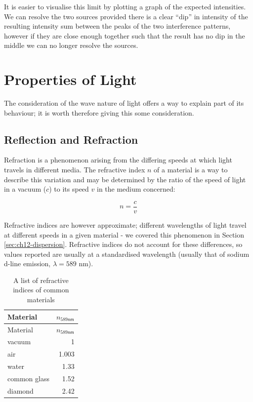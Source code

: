 \documentclass[
]{book}
\begin{document}
It is easier to visualise this limit by plotting a graph of the expected intensities. We can resolve the two sources provided there is a clear ``dip'' in intensity of the resulting intensity sum between the peaks of the two interference patterns, however if they are close enough together such that the result has no dip in the middle we can no longer resolve the sources.

\hypertarget{sec:ch14-propertieslight}{%
\chapter{Properties of Light}\label{sec:ch14-propertieslight}}

The consideration of the wave nature of light offers a way to explain part of its behaviour; it is worth therefore giving this some consideration.

\hypertarget{sec:ch14-reflectionrefraction}{%
\section{Reflection and Refraction}\label{sec:ch14-reflectionrefraction}}

Refraction is a phenomenon arising from the differing speeds at which light travels in different media. The refractive index \(n\) of a material is a way to describe this variation and may be determined by the ratio of the speed of light in a vacuum (\(c\)) to its speed \(v\) in the medium concerned:

\begin{equation}
n = \frac{c}{v}
\end{equation}

Refractive indices are however approximate; different wavelengths of light travel at different speeds in a given material - we covered this phenomenon in Section \ref{sec:ch12-dispersion}. Refractive indices do not account for these differences, so values reported are usually at a standardised wavelength (usually that of sodium d-line emission, \(\lambda = 589\) nm).

\begin{longtable}[]{@{}lr@{}}
\caption{\label{tab:ch14-refractiveindices} A list of refractive indices of common materials}\tabularnewline
\toprule
Material & \(n_{589 \textsf{nm}}\) \\
\midrule
\endfirsthead
\toprule
Material & \(n_{589 \textsf{nm}}\) \\
\midrule
\endhead
vacuum & 1 \\
air & 1.003 \\
water & 1.33 \\
common glass & 1.52 \\
diamond & 2.42 \\
\bottomrule
\end{longtable}
\end{document}
